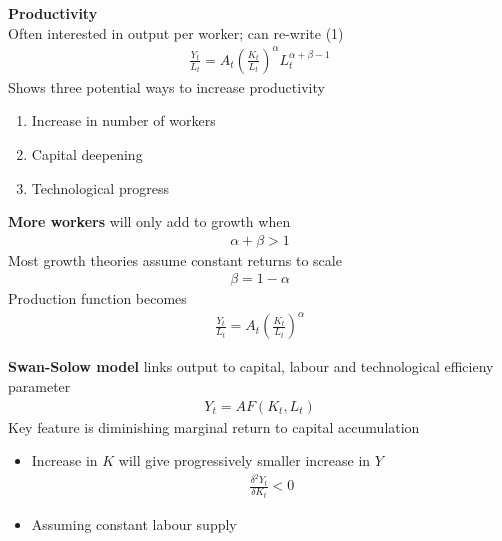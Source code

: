 \documentclass{beamer}
\begin{document}
\begin{frame}
 \textbf{Productivity}\\
 Often interested in output per worker; can re-write (1)
 \begin{align}
  \frac{Y_t}{L_t}= A_t \left(\frac{K_t}{L_t} \right)^{\alpha}L_t^{\alpha + \beta -1}
 \end{align}
 \medskip
 Shows three potential ways to increase productivity
 \begin{enumerate}
   \item Increase in number of workers
   \item Capital deepening
   \item Technological progress
 \end{enumerate}
\end{frame}

\begin{frame}
  \textbf{More workers} will only add to growth when
  \begin{align}
    \alpha+\beta>1
  \end{align}
  \medskip
  Most growth theories assume constant returns to scale
  \begin{align}
    \beta=1-\alpha
  \end{align}
  Production function becomes
  \begin{align}
    \frac{Y_t}{L_t}= A_t \left(\frac{K_t}{L_t} \right)^{\alpha}
  \end{align}
\end{frame}

\begin{frame}
  \textbf{Swan-Solow model} links output to capital, labour and technological efficieny parameter
  \begin{align}
    Y_t = AF(K_t,L_t) 
  \end{align}
  Key feature is diminishing marginal return to capital accumulation
  \begin{itemize}
    \item Increase in $K$ will give progressively smaller increase in $Y$
    \begin{align}
       \frac{\delta^2Y_t}{\delta K_t}<0    
    \end{align}
    \item Assuming constant labour supply
  \end{itemize}
\end{frame}
\end{document}
